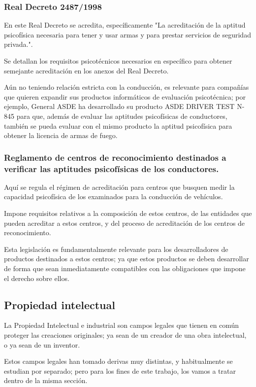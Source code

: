 \documentclass[12pt,a4paper,twoside,openright]{book}
\begin{document}
\subsubsection{Real Decreto 2487/1998}

En este Real Decreto se acredita, específicamente "La acreditación de la aptitud psicofísica necesaria para tener y usar armas y para prestar servicios de seguridad privada.".

Se detallan los requisitos psicotécnicos necesarios en específico para obtener semejante acreditación en los anexos del Real Decreto.

Aún no teniendo relación estricta con la conducción, es relevante para compañías que quieren expandir sus productos informáticos de evaluación psicotécnica; por ejemplo, General ASDE ha desarrollado su producto ASDE DRIVER TEST N-845 para que, además de evaluar las aptitudes psicofísicas de conductores, también se pueda evaluar con el mismo producto la aptitud psicofísica para obtener la licencia de armas de fuego. 

\subsubsection{Reglamento de centros de reconocimiento destinados a verificar las aptitudes psicofísicas de los conductores.}

Aquí se regula el régimen de acreditación para centros que busquen medir la capacidad psicofísica de los examinados para la conducción de vehículos.

Impone requisitos relativos a la composición de estos centros, de las entidades que pueden acreditar a estos centros, y del proceso de acreditación de los centros de reconocimiento.

Esta legislación es fundamentalmente relevante para los desarrolladores de productos destinados a estos centros; ya que estos productos se deben desarrollar de forma que sean inmediatamente compatibles con las obligaciones que impone el derecho sobre ellos.

\subsection{Propiedad intelectual}

La Propiedad Intelectual e industrial son campos legales que tienen en común proteger las creaciones originales; ya sean de un creador de una obra intelectual, o ya sean de un inventor.

Estos campos legales han tomado derivas muy distintas, y habitualmente se estudian por separado; pero para los fines de este trabajo, los vamos a tratar dentro de la misma sección.
\end{document}
